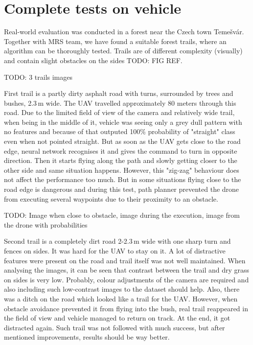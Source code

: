 \section{Complete tests on vehicle}

Real-world evaluation was conducted in a forest near the Czech town Temešvár. Together with MRS team, we have found a suitable forest trails, where an algorithm can be thoroughly tested. Trails are of different complexity (visually) and contain slight obstacles on the sides TODO: FIG REF. 

TODO: 3 trails images

First trail is a partly dirty asphalt road with turns, surrounded by trees and bushes, 2.3\,m wide. The UAV travelled approximately 80 meters through this road. Due to the limited field of view of the camera and relatively wide trail, when being in the middle of it, vehicle was seeing only a grey dull pattern with no features and because of that outputed 100\% probability of "straight" class even when not pointed straight. But as soon as the UAV gets close to the road edge, neural network recognises it and gives the command to turn in opposite direction. Then it starts flying along the path and slowly getting closer to the other side and same situation happens. However, this "zig-zag" behaviour does not affect the performance too much. But in some situations flying close to the road edge is dangerous and during this test, path planner prevented the drone from executing several waypoints due to their proximity to an obstacle.

TODO: Image when close to obstacle, image during the execution, image from the drone with probabilities

Second trail is a completely dirt road 2-2.3\,m wide with one sharp turn and fences on sides. It was hard for the UAV to stay on it. A lot of distractive features were present on the road and trail itself was not well maintained. When analysing the images, it can be seen that contrast between the trail and dry grass on sides is very low. Probably, colour adjustments of the camera are required and also including such low-contrast images to the dataset should help. Also, there was a ditch on the road which looked like a trail for the UAV. However, when obstacle avoidance prevented it from flying into the bush, real trail reappeared in the field of view and vehicle managed to return on track. At the end, it got distracted again. Such trail was not followed with much success, but after mentioned improvements, results should be way better.

